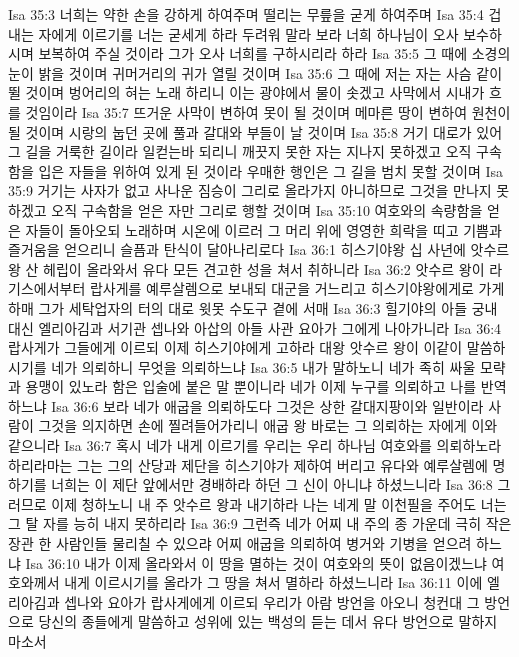Isa 35:3  너희는 약한 손을 강하게 하여주며 떨리는 무릎을 굳게 하여주며
Isa 35:4  겁내는 자에게 이르기를 너는 굳세게 하라 두려워 말라 보라 너희 하나님이 오사 보수하시며 보복하여 주실 것이라 그가 오사 너희를 구하시리라 하라
Isa 35:5  그 때에 소경의 눈이 밝을 것이며 귀머거리의 귀가 열릴 것이며
Isa 35:6  그 때에 저는 자는 사슴 같이 뛸 것이며 벙어리의 혀는 노래 하리니 이는 광야에서 물이 솟겠고 사막에서 시내가 흐를 것임이라
Isa 35:7  뜨거운 사막이 변하여 못이 될 것이며 메마른 땅이 변하여 원천이 될 것이며 시랑의 눕던 곳에 풀과 갈대와 부들이 날 것이며
Isa 35:8  거기 대로가 있어 그 길을 거룩한 길이라 일컫는바 되리니 깨끗지 못한 자는 지나지 못하겠고 오직 구속함을 입은 자들을 위하여 있게 된 것이라 우매한 행인은 그 길을 범치 못할 것이며
Isa 35:9  거기는 사자가 없고 사나운 짐승이 그리로 올라가지 아니하므로 그것을 만나지 못하겠고 오직 구속함을 얻은 자만 그리로 행할 것이며
Isa 35:10  여호와의 속량함을 얻은 자들이 돌아오되 노래하며 시온에 이르러 그 머리 위에 영영한 희락을 띠고 기쁨과 즐거움을 얻으리니 슬픔과 탄식이 달아나리로다
Isa 36:1  히스기야왕 십 사년에 앗수르 왕 산 헤립이 올라와서 유다 모든 견고한 성을 쳐서 취하니라
Isa 36:2  앗수르 왕이 라기스에서부터 랍사게를 예루살렘으로 보내되 대군을 거느리고 히스기야왕에게로 가게 하매 그가 세탁업자의 터의 대로 윗못 수도구 곁에 서매
Isa 36:3  힐기야의 아들 궁내 대신 엘리아김과 서기관 셉나와 아삽의 아들 사관 요아가 그에게 나아가니라
Isa 36:4  랍사게가 그들에게 이르되 이제 히스기야에게 고하라 대왕 앗수르 왕이 이같이 말씀하시기를 네가 의뢰하니 무엇을 의뢰하느냐
Isa 36:5  내가 말하노니 네가 족히 싸울 모략과 용맹이 있노라 함은 입술에 붙은 말 뿐이니라 네가 이제 누구를 의뢰하고 나를 반역하느냐
Isa 36:6  보라 네가 애굽을 의뢰하도다 그것은 상한 갈대지팡이와 일반이라 사람이 그것을 의지하면 손에 찔려들어가리니 애굽 왕 바로는 그 의뢰하는 자에게 이와 같으니라
Isa 36:7  혹시 네가 내게 이르기를 우리는 우리 하나님 여호와를 의뢰하노라 하리라마는 그는 그의 산당과 제단을 히스기야가 제하여 버리고 유다와 예루살렘에 명하기를 너희는 이 제단 앞에서만 경배하라 하던 그 신이 아니냐 하셨느니라
Isa 36:8  그러므로 이제 청하노니 내 주 앗수르 왕과 내기하라 나는 네게 말 이천필을 주어도 너는 그 탈 자를 능히 내지 못하리라
Isa 36:9  그런즉 네가 어찌 내 주의 종 가운데 극히 작은 장관 한 사람인들 물리칠 수 있으랴 어찌 애굽을 의뢰하여 병거와 기병을 얻으려 하느냐
Isa 36:10  내가 이제 올라와서 이 땅을 멸하는 것이 여호와의 뜻이 없음이겠느냐 여호와께서 내게 이르시기를 올라가 그 땅을 쳐서 멸하라 하셨느니라
Isa 36:11  이에 엘리아김과 셉나와 요아가 랍사게에게 이르되 우리가 아람 방언을 아오니 청컨대 그 방언으로 당신의 종들에게 말씀하고 성위에 있는 백성의 듣는 데서 유다 방언으로 말하지 마소서
